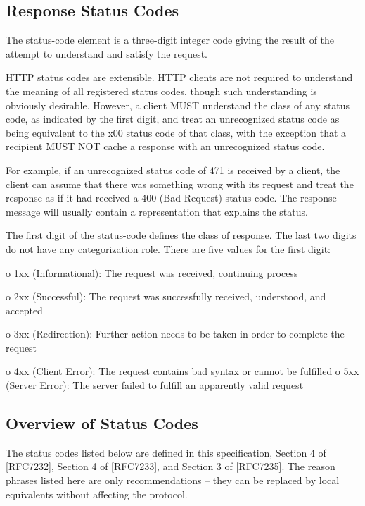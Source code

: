 \subsection{Response Status Codes} 
The status-code element is a three-digit integer code giving the
   result of the attempt to understand and satisfy the request.

   HTTP status codes are extensible.  HTTP clients are not required to
   understand the meaning of all registered status codes, though such
   understanding is obviously desirable.  However, a client MUST
   understand the class of any status code, as indicated by the first
   digit, and treat an unrecognized status code as being equivalent to
   the x00 status code of that class, with the exception that a
   recipient MUST NOT cache a response with an unrecognized status code.

   For example, if an unrecognized status code of 471 is received by a
   client, the client can assume that there was something wrong with its
   request and treat the response as if it had received a 400 (Bad
   Request) status code.  The response message will usually contain a
   representation that explains the status.

   The first digit of the status-code defines the class of response.
   The last two digits do not have any categorization role.  There are
   five values for the first digit:

   o  1xx (Informational): The request was received, continuing process

   o  2xx (Successful): The request was successfully received,
      understood, and accepted

   o  3xx (Redirection): Further action needs to be taken in order to
      complete the request

   o  4xx (Client Error): The request contains bad syntax or cannot be
      fulfilled
      o  5xx (Server Error): The server failed to fulfill an apparently
      valid request

\subsection{Overview of Status Codes}

   The status codes listed below are defined in this specification,
   Section 4 of [RFC7232], Section 4 of [RFC7233], and Section 3 of
   [RFC7235].  The reason phrases listed here are only recommendations
   -- they can be replaced by local equivalents without affecting the
   protocol.

